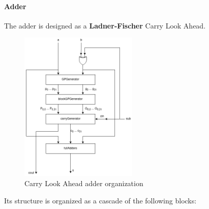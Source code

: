 \paragraph{Adder}
The adder is designed as a \textbf{Ladner-Fischer} Carry Look Ahead.
\begin{figure}[htbp]
    \center
	\includegraphics[width=0.5\textwidth]{./2-implementation/images/AdderCLADiagram.png}
	\caption{Carry Look Ahead adder organization}
	\label{fig:adder-diagram}
\end{figure}
Its structure is organized as a cascade of the following
blocks:
